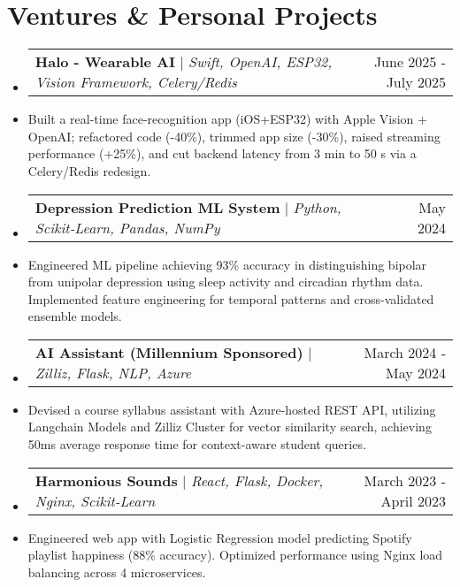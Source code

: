 \documentclass[letterpaper,11pt]{article}
\makeatletter
\newcommand{\resumeItem}[1]{
  \item\small{
    {#1}
  }
}
\newcommand{\resumeProjectHeading}[3]{
    \vspace{-2pt}\item
    \begin{tabular*}{\textwidth}[t]
    {@{}l@{\extracolsep{\fill}}r@{}}
    \normalsize{\textbf{#1} $|$ \emph{#2}} & \normalsize{#3}
    \end{tabular*}\vspace{-4pt}
}
\newcommand{\resumeSubHeadingListStart}{\begin{itemize}[leftmargin=0.0in, label={}]}
\newcommand{\resumeSubHeadingListEnd}{\end{itemize}\vspace{-4.5pt}}
\makeatother
\begin{document}
\section{Ventures \& Personal Projects}
\resumeSubHeadingListStart

\resumeProjectHeading
{Halo - Wearable AI}{Swift, OpenAI, ESP32, Vision Framework, Celery/Redis}{June 2025 - July 2025}
\resumeItem{Built a real-time face-recognition app (iOS+ESP32) with Apple Vision + OpenAI; refactored code (-40\%), trimmed app size (-30\%), raised streaming performance (+25\%), and cut backend latency from 3 min to 50 s via a Celery/Redis redesign.}

\resumeProjectHeading
{Depression Prediction ML System}{Python, Scikit-Learn, Pandas, NumPy}{May 2024}
\resumeItem{Engineered ML pipeline achieving 93\% accuracy in distinguishing bipolar from unipolar depression using sleep activity and circadian rhythm data. Implemented feature engineering for temporal patterns and cross-validated ensemble models.}

\resumeProjectHeading
{AI Assistant (Millennium Sponsored)}{Zilliz, Flask, NLP, Azure}{March 2024 - May 2024}
\resumeItem{Devised a course syllabus assistant with Azure-hosted REST API, utilizing Langchain Models and Zilliz Cluster for vector similarity search, achieving 50ms average response time for context-aware student queries.}

\resumeProjectHeading{Harmonious Sounds}{React, Flask, Docker, Nginx, Scikit-Learn}{March 2023 - April 2023}
\resumeItem{Engineered web app with Logistic Regression model predicting Spotify playlist happiness (88\% accuracy). Optimized performance using Nginx load balancing across 4 microservices.}

\resumeSubHeadingListEnd

\end{document}
